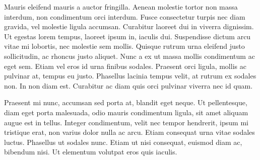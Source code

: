 \documentclass[a4paper]{article}
\begin{document}
Mauris eleifend mauris a auctor fringilla. Aenean molestie tortor non massa interdum, non condimentum orci interdum. Fusce consectetur turpis nec diam gravida, vel molestie ligula accumsan. Curabitur laoreet dui in viverra dignissim. Ut egestas lorem tempus, laoreet ipsum in, iaculis dui. Suspendisse dictum arcu vitae mi lobortis, nec molestie sem mollis. Quisque rutrum urna eleifend justo sollicitudin, ac rhoncus justo aliquet. Nunc a ex ut massa mollis condimentum ac eget sem. Etiam vel eros id urna finibus sodales. Praesent orci ligula, mollis ac pulvinar at, tempus eu justo. Phasellus lacinia tempus velit, at rutrum ex sodales non. In non diam est. Curabitur ac diam quis orci pulvinar viverra nec id quam.

Praesent mi nunc, accumsan sed porta at, blandit eget neque. Ut pellentesque, diam eget porta malesuada, odio mauris condimentum ligula, sit amet aliquam augue est in tellus. Integer condimentum, velit nec tempor hendrerit, ipsum mi tristique erat, non varius dolor nulla ac arcu. Etiam consequat urna vitae sodales luctus. Phasellus ut sodales nunc. Etiam ut nisi consequat, euismod diam ac, bibendum nisi. Ut elementum volutpat eros quis iaculis.
    
\end{document}
